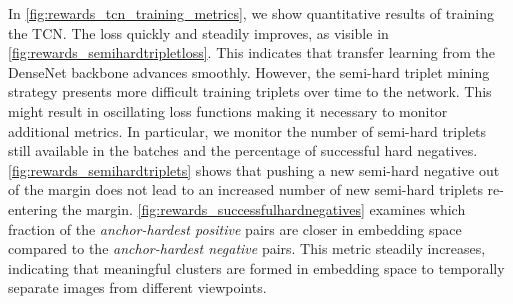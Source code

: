\documentclass[\home/main.tex]{subfiles}
\begin{document}
In \cref{fig:rewards_tcn_training_metrics}, we show quantitative results of training the TCN. The loss quickly and steadily improves, as visible in \cref{fig:rewards_semihardtripletloss}. This indicates that transfer learning from the DenseNet backbone advances smoothly. However, the semi-hard triplet mining strategy presents more difficult training triplets over time to the network. This might result in oscillating loss functions making it necessary to monitor additional metrics. In particular, we monitor the number of semi-hard triplets still available in the batches and the percentage of successful hard negatives. \cref{fig:rewards_semihardtriplets} shows that pushing a new semi-hard negative out of the margin does not lead to an increased number of new semi-hard triplets re-entering the margin. \cref{fig:rewards_successfulhardnegatives} examines which fraction of the \textit{anchor-hardest positive} pairs are closer in embedding space compared to the \textit{anchor-hardest negative} pairs. This metric steadily increases, indicating that meaningful clusters are formed in embedding space to temporally separate images from different viewpoints.
\end{document}
